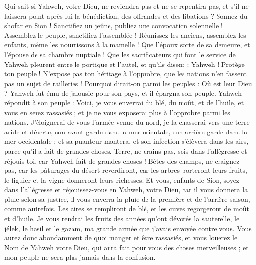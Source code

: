 \begin{multicols}{2}
Qui sait si Yahweh, votre Dieu, ne reviendra pas et ne se repentira pas, et s'il ne laissera point après lui la bénédiction, des offrandes et des libations ?
Sonnez du shofar en Sion ! Sanctifiez un jeûne, publiez une convocation solennelle !
Assemblez le peuple, sanctifiez l’assemblée ! Réunissez les anciens, assemblez les enfants, même les nourrissons à la mamelle ! Que l’époux sorte de sa demeure, et l’épouse de sa chambre nuptiale !
Que les sacrificateurs qui font le service de Yahweh pleurent entre le portique et l'autel, et qu'ils disent : Yahweh ! Protège ton peuple ! N’expose pas ton héritage à l'opprobre, que les nations n’en fassent pas un sujet de railleries ! Pourquoi dirait-on parmi les peuples : Où est leur Dieu ?
Yahweh fut ému de jalousie pour son pays, et il épargna son peuple.
Yahweh répondit à son peuple : Voici, je vous enverrai du blé, du moût, et de l'huile, et vous en serez rassasiés ; et je ne vous exposerai plus à l'opprobre parmi les nations.
J'éloignerai de vous l’armée venue du nord, je la chasserai vers une terre aride et déserte, son avant-garde dans la mer orientale, son arrière-garde dans la mer occidentale ; et sa puanteur montera, et son infection s’élèvera dans les airs, parce qu’il a fait de grandes choses.
Terre, ne crains pas, sois dans l’allégresse et réjouis-toi, car Yahweh fait de grandes choses !
Bêtes des champs, ne craignez pas, car les pâturages du désert reverdiront, car les arbres porteront leurs fruits, le figuier et la vigne donneront leurs richesses.
Et vous, enfants de Sion, soyez dans l’allégresse et réjouissez-vous en Yahweh, votre Dieu, car il vous donnera la pluie selon sa justice, il vous enverra la pluie de la première et de l’arrière-saison, comme autrefois.
Les aires se rempliront de blé, et les cuves regorgeront de moût et d'huile.
Je vous rendrai les fruits des années qu’ont dévorés la sauterelle, le jélek, le hasil et le gazam, ma grande armée que j’avais envoyée contre vous.
Vous aurez donc abondamment de quoi manger et être rassasiés, et vous louerez le Nom de Yahweh votre Dieu, qui aura fait pour vous des choses merveilleuses ; et mon peuple ne sera plus jamais dans la confusion.

\end{multicols}
